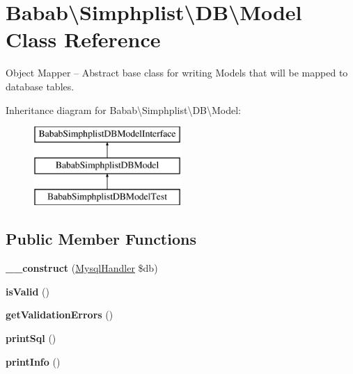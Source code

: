 \hypertarget{classBabab_1_1Simphplist_1_1DB_1_1Model}{\section{Babab\textbackslash{}Simphplist\textbackslash{}D\+B\textbackslash{}Model Class Reference}
\label{classBabab_1_1Simphplist_1_1DB_1_1Model}
}


Object Mapper -- Abstract base class for writing Models that will be mapped to database tables.  


Inheritance diagram for Babab\textbackslash{}Simphplist\textbackslash{}D\+B\textbackslash{}Model\+:\begin{figure}[H]
\begin{center}
\leavevmode
\includegraphics[height=3.000000cm]{classBabab_1_1Simphplist_1_1DB_1_1Model}
\end{center}
\end{figure}
\subsection*{Public Member Functions}
\begin{DoxyCompactItemize}
\item 
\hypertarget{classBabab_1_1Simphplist_1_1DB_1_1Model_a661b8c733241ca8031195fe5a71b3ec4}{{\bfseries \+\_\+\+\_\+construct} (\hyperlink{classBabab_1_1Simphplist_1_1DB_1_1MysqlHandler}{Mysql\+Handler} \$db)}\label{classBabab_1_1Simphplist_1_1DB_1_1Model_a661b8c733241ca8031195fe5a71b3ec4}

\item 
\hypertarget{classBabab_1_1Simphplist_1_1DB_1_1Model_a9d9f042b1ec3358a6b2c5f81ca335b87}{{\bfseries is\+Valid} ()}\label{classBabab_1_1Simphplist_1_1DB_1_1Model_a9d9f042b1ec3358a6b2c5f81ca335b87}

\item 
\hypertarget{classBabab_1_1Simphplist_1_1DB_1_1Model_a6940e9d2fcd0940e700bd96309718bc0}{{\bfseries get\+Validation\+Errors} ()}\label{classBabab_1_1Simphplist_1_1DB_1_1Model_a6940e9d2fcd0940e700bd96309718bc0}

\item 
\hypertarget{classBabab_1_1Simphplist_1_1DB_1_1Model_ab390eb521865138e82061a75ea75534e}{{\bfseries print\+Sql} ()}\label{classBabab_1_1Simphplist_1_1DB_1_1Model_ab390eb521865138e82061a75ea75534e}

\item 
\hypertarget{classBabab_1_1Simphplist_1_1DB_1_1Model_ab43d7cccf1a6bb05ef8c0e356fc73698}{{\bfseries print\+Info} ()}\label{classBabab_1_1Simphplist_1_1DB_1_1Model_ab43d7cccf1a6bb05ef8c0e356fc73698}

\end{DoxyCompactItemize}
